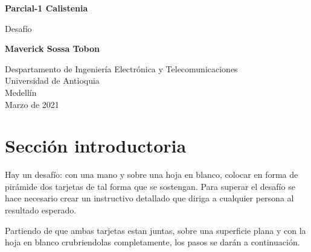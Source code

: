 \documentclass{article}
\begin{document}
\begin{titlepage}
    \begin{center}
        \vspace*{1cm}
            
        \Huge
        \textbf{Parcial-1 Calistenia}
            
        \vspace{0.5cm}
        \LARGE
        Desafío
            
        \vspace{1.5cm}
            
        \textbf{Maverick Sossa Tobon}
            
        \vfill
            
        \vspace{0.8cm}
            
        \Large
        Despartamento de Ingeniería Electrónica y Telecomunicaciones\\
        Universidad de Antioquia\\
        Medellín\\
        Marzo de 2021
            
    \end{center}
\end{titlepage}

\tableofcontents
\newpage
\section{Sección introductoria}\label{intro}
Hay un desafío: con una mano y sobre una hoja en blanco, colocar en forma de pirámide dos tarjetas de tal forma que se sostengan. Para superar el desafío se hace necesario crear un instructivo detallado que diriga a cualquier persona al resultado esperado. 

Partiendo de que ambas tarjetas estan juntas, sobre una superficie plana y con la hoja en blanco crubriendolas completamente, los pasos se darán a continuación.  
\end{document}
